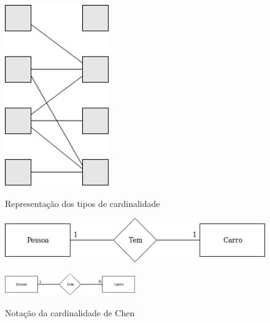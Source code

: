 \documentclass[11pt,twoside,a4paper]{report}
\begin{document}
\begin{figure}[H]
\begin{minipage}{0.3\textwidth}
	\end{minipage}%
	\begin{minipage}{0.3\textwidth}
		\begin{center}
			\includegraphics[width=0.4\textwidth]{notacao10} %
			\label{fig:der53}
		\end{center}
	\end{minipage}
	\caption{Representação dos tipos de cardinalidade}
	\label{fig:der5}
\end{figure}
\vspace{.5cm}
\begin{figure}[H]
	\centering
	\begin{minipage}{1\textwidth}
		\begin{center}
			\includegraphics[width=.5\textwidth]{notacao11} %
			\label{fig:der61}
		\end{center}
	\end{minipage}
	\begin{minipage}{1\textwidth}
		\begin{center}
			\includegraphics[width=0.5\textwidth]{notacao12} %
			\label{fig:der62}
		\end{center}
	\end{minipage}
	\caption{Notação da cardinalidade de Chen}
	\label{fig:der6}
\end{figure}
\end{document}
